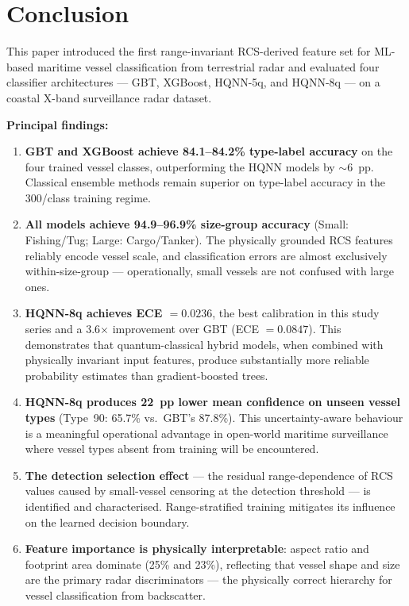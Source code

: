 \documentclass[journal]{IEEEtran}
\begin{document}
\section{Conclusion}
\label{sec:conclusion}

This paper introduced the first range-invariant RCS-derived feature set
for ML-based maritime vessel classification from terrestrial radar and
evaluated four classifier architectures — GBT, XGBoost, HQNN-5q, and
HQNN-8q — on a coastal X-band surveillance radar dataset.

\medskip
\noindent\textbf{Principal findings:}

\begin{enumerate}
  \item \textbf{GBT and XGBoost achieve 84.1--84.2\% type-label accuracy}
        on the four trained vessel classes, outperforming the HQNN models
        by $\sim$6~pp. Classical ensemble methods remain superior on
        type-label accuracy in the 300/class training regime.

  \item \textbf{All models achieve 94.9--96.9\% size-group accuracy}
        (Small: Fishing/Tug; Large: Cargo/Tanker). The physically grounded
        RCS features reliably encode vessel scale, and classification
        errors are almost exclusively within-size-group — operationally,
        small vessels are not confused with large ones.

  \item \textbf{HQNN-8q achieves ECE $= 0.0236$}, the best calibration
        in this study series and a 3.6$\times$ improvement over GBT
        (ECE $= 0.0847$). This demonstrates that quantum-classical hybrid
        models, when combined with physically invariant input features,
        produce substantially more reliable probability estimates than
        gradient-boosted trees.

  \item \textbf{HQNN-8q produces 22~pp lower mean confidence on unseen
        vessel types} (Type~90: 65.7\% vs.\ GBT's 87.8\%). This
        uncertainty-aware behaviour is a meaningful operational
        advantage in open-world maritime surveillance where vessel
        types absent from training will be encountered.

  \item \textbf{The detection selection effect} — the residual
        range-dependence of RCS values caused by small-vessel censoring
        at the detection threshold — is identified and characterised.
        Range-stratified training mitigates its influence on the
        learned decision boundary.

  \item \textbf{Feature importance is physically interpretable}:
        aspect ratio and footprint area dominate (25\% and 23\%),
        reflecting that vessel shape and size are the primary radar
        discriminators — the physically correct hierarchy for vessel
        classification from backscatter.
\end{enumerate}
\end{document}

